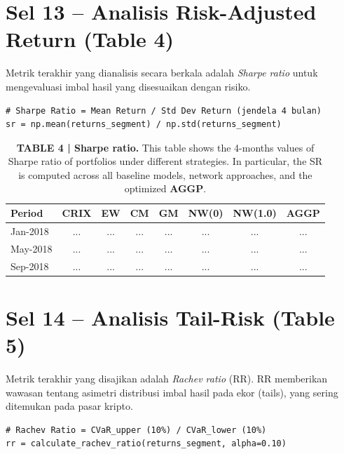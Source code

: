 \documentclass[12pt,a4paper]{article}
\begin{document}
\section{Sel 13 -- Analisis Risk-Adjusted Return (Table 4)}
Metrik terakhir yang dianalisis secara berkala adalah \textit{Sharpe ratio} untuk mengevaluasi imbal hasil yang disesuaikan dengan risiko.

\begin{lstlisting}[caption={Kalkulasi Sharpe Ratio Periodik}]
# Sharpe Ratio = Mean Return / Std Dev Return (jendela 4 bulan)
sr = np.mean(returns_segment) / np.std(returns_segment)
\end{lstlisting}

\begin{table}[h]
    \centering
    \footnotesize
    \caption{\textbf{TABLE 4 | Sharpe ratio.} This table shows the 4-months values of Sharpe ratio of portfolios under different strategies. In particular, the SR is computed across all baseline models, network approaches, and the optimized \textbf{AGGP}.}
    \begin{tabular}{lccccccc}
        \toprule
        Period & CRIX & EW & CM & GM & NW(0) & NW(1.0) & AGGP \\
        \midrule
        Jan-2018 & ... & ... & ... & ... & ... & ... & ... \\
        May-2018 & ... & ... & ... & ... & ... & ... & ... \\
        Sep-2018 & ... & ... & ... & ... & ... & ... & ... \\
        \bottomrule
    \end{tabular}
\end{table}

\section{Sel 14 -- Analisis Tail-Risk (Table 5)}
Metrik terakhir yang disajikan adalah \textit{Rachev ratio} (RR). RR memberikan wawasan tentang asimetri distribusi imbal hasil pada ekor (tails), yang sering ditemukan pada pasar kripto.

\begin{lstlisting}[caption={Kalkulasi Rachev Ratio Periodik}]
# Rachev Ratio = CVaR_upper (10%) / CVaR_lower (10%)
rr = calculate_rachev_ratio(returns_segment, alpha=0.10)
\end{lstlisting}
\end{document}
